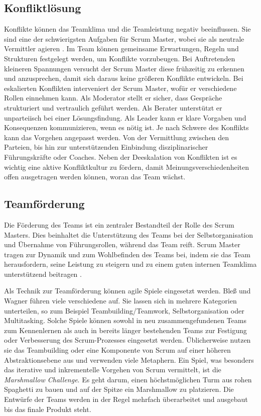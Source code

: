 \documentclass[5pt, final]{beamer}
\begin{document}
\begin{frame}[t]
\begin{multicols}{3}
			\subsection{Konfliktlösung}
			
			Konflikte können das Teamklima und die Teamleistung negativ beeinflussen. Sie sind eine der schwierigsten Aufgaben für Scrum Master, wobei sie als neutrale Vermittler agieren \cite{Noll17}.
			Im Team können gemeinsame Erwartungen, Regeln und Strukturen festgelegt werden, um Konflikte vorzubeugen. Bei Auftretenden kleineren Spannungen versucht der Scrum Master diese frühzeitig zu erkennen und anzusprechen, damit sich daraus keine größeren Konflikte entwickeln. Bei eskalierten Konflikten interveniert der Scrum Master, wofür er verschiedene Rollen einnehmen kann. Als Moderator stellt er sicher, dass Gespräche strukturiert und vertraulich geführt werden. Als Berater unterstützt er unparteiisch bei einer Lösungsfindung. Als Leader kann er klare Vorgaben und Konsequenzen kommunizieren, wenn es nötig ist.
			Je nach Schwere des Konflikts kann das Vorgehen angepasst werden. Von der Vermittlung zwischen den Parteien, bis hin zur unterstützenden Einbindung disziplinarischer Führungskräfte oder Coaches. Neben der Deeskalation von Konflikten ist es wichtig eine aktive Konfliktkultur zu fördern, damit Meinungsverschiedenheiten offen ausgetragen werden können, woran das Team wächst. \cite{Anker23}
			
			\subsection{Teamförderung}
			
			Die Förderung des Teams ist ein zentraler Bestandteil der Rolle des Scrum Masters.
            Dies beinhaltet die Unterstützung des Teams bei der Selbstorganisation und Übernahme von Führungsrollen, während das Team reift. Scrum Master tragen zur Dynamik und zum Wohlbefinden des Teams bei, indem sie das Team herausfordern, seine Leistung zu steigern und zu einem guten internen Teamklima unterstützend beitragen \cite{Spiegler21}.
            
            Als Technik zur Teamförderung können agile Spiele eingesetzt werden.
            Bleß und Wagner \cite{bless24} führen viele verschiedene auf.
            Sie lassen sich in mehrere Kategorien unterteilen, so zum Beispiel Teambuilding/Teamwork, Selbstorganisation oder Multitasking.
            Solche Spiele können sowohl in neu zusammengefundenen Teams zum Kennenlernen als auch in bereits länger bestehenden Teams zur Festigung oder Verbesserung des Scrum-Prozesses eingesetzt werden.
            Üblicherweise nutzen sie das Teambuilding oder eine Komponente von Scrum auf einer höheren Abstraktionsebene aus und verwenden viele Metaphern.
            Ein Spiel, was besonders das iterative und inkrementelle Vorgehen von Scrum vermittelt, ist die \textit{Marshmallow Challenge}.
            Es geht darum, einen höchstmöglichen Turm aus rohen Spaghetti zu bauen und auf der Spitze ein Marshmallow zu platzieren.
            Die Entwürfe der Teams werden in der Regel mehrfach überarbeitet und ausgebaut bis das finale Produkt steht.\cite{bless24}
			

\end{multicols}
\end{frame}
\end{document}
